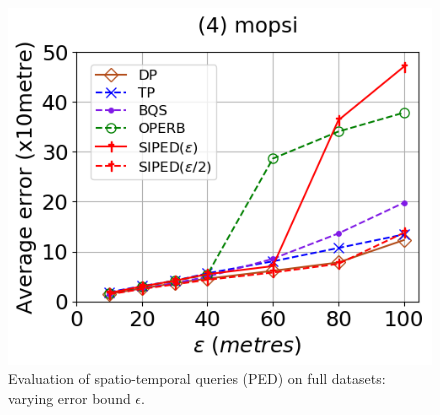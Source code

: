 \begin{figure}[tb!]
\includegraphics[scale = 0.320]{Figures/Exp-query-PED-error-epsilon-mopsi.png}\hspace{3ex}
\caption{\small Evaluation of spatio-temporal queries (PED) on full datasets: varying error bound $\epsilon$.}
\label{fig:query-ped-epsilon}
\end{figure}

